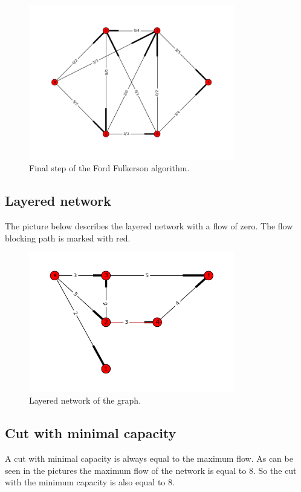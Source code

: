\documentclass[a4paper,12px]{article}
\begin{document}
\begin{figure}[H]
    \includegraphics[width=0.8\textwidth]{figure1a_c.png}
    \caption{Final step of the Ford Fulkerson algorithm.}
\end{figure}

\subsection{Layered network}

The picture below describes the layered network with a flow of zero. The flow
blocking path is marked with red.
\begin{figure}[H]
    \includegraphics[width=0.8\textwidth]{figure1b_marked.png}
    \caption{Layered network of the graph.}
\end{figure}

\subsection{Cut with minimal capacity}

A cut with minimal capacity is always equal to the maximum flow. As can be seen
in the pictures the maximum flow of the network is equal to 8. So the cut with
the minimum capacity is also equal to 8.
\end{document}
